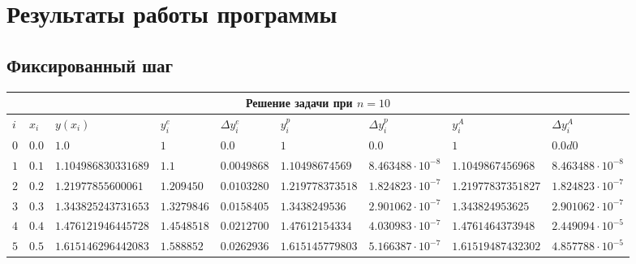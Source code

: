 \section{Результаты работы программы}
\subsection{Фиксированный шаг}
\begin{table}[h!]
	\hspace{-3em}
	\scriptsize
	\begin{tabular}{|p{2ex}|p{3ex}|l|l|l|l|l|l|l|}
		\hline
		\multicolumn{9}{|c|}{Решение задачи при $n = 10$}                                                                                                                                                                              \\
		\hline
		$i$    & $x_i$                   & $y(x_i)$               & $y^e_i$                  & $\Delta y^e_i$           & $y^p_i$                  & $\Delta y^p_i$            & $y^A_i$                  & $\Delta y^A_i$             \\
		\hline
		$  0 $ & $                 0.0 $ & $                1.0 $ & $                    1 $ & $                  0.0 $ & $                    1 $ & $                0.0 $    & $                    1 $ & $                 0.0d0 $  \\
		$  1 $ & $                 0.1 $ & $ 1.104986830331689 $  & $                1.1 $   & $ 0.0049868 $            & $  1.10498674569 $       & $ 8.463488\cdot 10^{-8} $ & $  1.1049867456968 $     & $  8.463488\cdot 10^{-8} $ \\
		$  2 $ & $                 0.2 $ & $  1.21977855600061 $  & $  1.209450 $            & $ 0.0103280 $            & $ 1.219778373518 $       & $ 1.824823\cdot 10^{-7} $ & $ 1.21977837351827 $     & $  1.824823\cdot 10^{-7} $ \\
		$  3 $ & $ 0.3 $                 & $ 1.343825243731653 $  & $ 1.3279846 $            & $ 0.0158405 $            & $   1.3438249536 $       & $ 2.901062\cdot 10^{-7} $ & $   1.343824953625 $     & $  2.901062\cdot 10^{-7} $ \\
		$  4 $ & $                 0.4 $ & $ 1.476121946445728 $  & $ 1.4548518 $            & $ 0.0212700 $            & $  1.47612154334 $       & $ 4.030983\cdot 10^{-7} $ & $  1.4761464373948 $     & $  2.449094\cdot 10^{-5} $ \\
		$  5 $ & $                 0.5 $ & $ 1.615146296442083 $  & $  1.588852 $            & $ 0.0262936 $            & $ 1.615145779803 $       & $ 5.166387\cdot 10^{-7} $ & $ 1.61519487432302 $     & $  4.857788\cdot 10^{-5} $ \\

\end{tabular}
\end{table}
